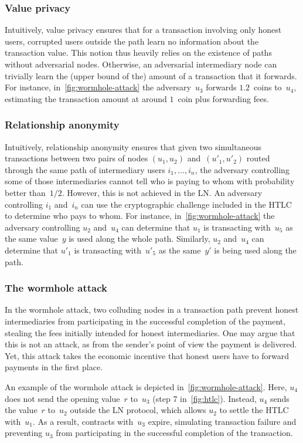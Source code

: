 \subsubsection*{Value privacy}
Intuitively, value privacy ensures that for a transaction involving only honest users, corrupted users outside the path learn no information about the transaction value.
This notion thus heavily relies on the existence of paths without adversarial nodes.
Otherwise, an adversarial intermediary node can trivially learn the (upper bound of the) amount of a transaction that it forwards.
For instance, in~\cref{fig:wormhole-attack} the adversary~$u_3$ forwards $1.2$~coins to~$u_4$, estimating the transaction amount at around $1$~coin plus forwarding fees.

\subsubsection*{Relationship anonymity}
Intuitively, relationship anonymity ensures that given two simultaneous transactions between two pairs of nodes $(u_1, u_2)$ and~$(u'_1, u'_2)$ routed through the same path of intermediary users $i_1, \ldots, i_n$, the adversary controlling some of those intermediaries cannot tell who is paying to whom with probability better than~$1/2$.
However, this is not achieved in the LN\@.
An adversary controlling $i_1$ and~$i_n$ can use the cryptographic challenge included in the HTLC to determine who pays to whom.
For instance, in~\cref{fig:wormhole-attack} the adversary controlling $u_2$ and~$u_4$ can determine that $u_1$ is transacting with~$u_5$ as the same value~$y$ is used along the whole path.
Similarly, $u_2$ and~$u_4$ can determine that $u'_1$ is transacting with~$u'_5$ as the same~$y'$ is being used along the path.

\subsubsection*{The wormhole attack}
In the wormhole attack, two colluding nodes in a transaction path prevent honest intermediaries from participating in the successful completion of the payment, stealing the fees initially intended for honest intermediaries.
One may argue that this is not an attack, as from the sender's point of view the payment is delivered.
Yet, this attack takes the economic incentive that honest users have to forward payments in the first place.

An example of the wormhole attack is depicted in~\cref{fig:wormhole-attack}.
Here, $u_4$ does not send the opening value~$r$ to~$u_3$ (step 7 in~\cref{fig:htlc}).
Instead, $u_4$ sends the value~$r$ to~$u_2$ outside the LN protocol, which allows $u_2$ to settle the HTLC with~$u_1$.
As a result, contracts with~$u_3$ expire, simulating transaction failure and preventing $u_3$ from participating in the successful completion of the transaction.



